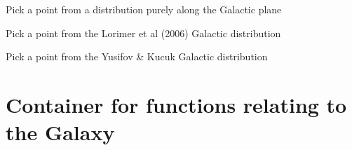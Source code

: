 \documentclass[letterpaper,10pt,english]{sphinxmanual}
\begin{document}
\begin{fulllineitems}
\label{\detokenize{module-level-docs:radialmodels.diskdist}}
\pysigstartsignatures
\pysiglinewithargsret
{}
{}
{}
\pysigstopsignatures
\sphinxAtStartPar
Pick a point from a distribution purely along the Galactic plane

\end{fulllineitems}


\begin{fulllineitems}
\label{\detokenize{module-level-docs:radialmodels.lfl06}}
\pysigstartsignatures
\pysiglinewithargsret
{}
{}
{}
\pysigstopsignatures
\sphinxAtStartPar
Pick a point from the Lorimer et al (2006) Galactic distribution

\end{fulllineitems}


\begin{fulllineitems}
\label{\detokenize{module-level-docs:radialmodels.ykr}}
\pysigstartsignatures
\pysiglinewithargsret
{}
{}
{}
\pysigstopsignatures
\sphinxAtStartPar
Pick a point from the Yusifov \& Kucuk Galactic distribution

\end{fulllineitems}



\section{{\hyperref[\detokenize{module-level-docs:module-galacticops}]{}} \textendash{} Container for functions relating to the Galaxy}
\label{\detokenize{module-level-docs:module-galacticops}}\label{\detokenize{module-level-docs:galacticops-container-for-functions-relating-to-the-galaxy}}\label{\detokenize{module-level-docs:galacticops-module-docs}}
\end{document}
